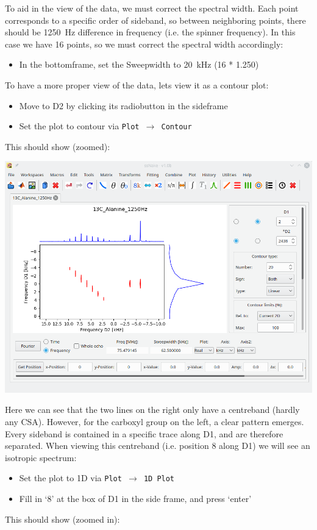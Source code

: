 \documentclass[11pt,a4paper]{article}
\begin{document}
To aid in the view of the data, we must correct the spectral width. Each point corresponds to a
specific order of sideband, so between neighboring points, there should be \SI{1250}{\Hz} difference in
frequency (i.e. the spinner frequency). In this case we have 16 points, so we must correct the
spectral width accordingly:
\begin{itemize}
  \item In the bottomframe, set the Sweepwidth to \SI{20}{\kHz} (16 * 1.250)
\end{itemize}
To have a more proper view of the data, lets view it as a contour plot:
\begin{itemize}
  \item Move to D2 by clicking its radiobutton in the sideframe
  \item Set the plot to contour via \texttt{Plot $\longrightarrow$ Contour}
\end{itemize}
This should show (zoomed):
\begin{center}
\includegraphics[width=0.8\linewidth]{Figs/Fig4.png}
\end{center}
Here we can see that the two lines on the right only have a centreband (hardly any CSA). However,
for the carboxyl group on the left, a clear pattern emerges. Every sideband is contained in a
specific trace along D1, and are therefore separated. When viewing this centreband (i.e. position 8
along D1) we will see an isotropic spectrum:
\begin{itemize}
  \item Set the plot to 1D via \texttt{Plot $\longrightarrow$ 1D Plot}
  \item Fill in `8' at the box of D1 in the side frame, and press `enter'
\end{itemize}
This should show (zoomed in):
\end{document}
